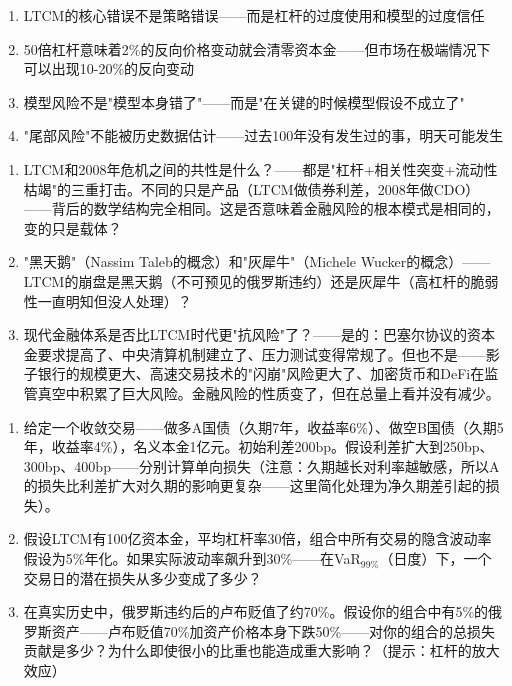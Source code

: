 \documentclass[a4paper,11pt]{ctexbook}
\begin{document}
\begin{lessonsummary}
\begin{enumerate}
  \item LTCM的核心错误不是策略错误——而是杠杆的过度使用和模型的过度信任
  \item 50倍杠杆意味着2\%的反向价格变动就会清零资本金——但市场在极端情况下可以出现10-20\%的反向变动
  \item 模型风险不是"模型本身错了"——而是"在关键的时候模型假设不成立了"
  \item "尾部风险"不能被历史数据估计——过去100年没有发生过的事，明天可能发生
\end{enumerate}
\end{lessonsummary}

\begin{discuss}
\begin{enumerate}
  \item LTCM和2008年危机之间的共性是什么？——都是"杠杆+相关性突变+流动性枯竭"的三重打击。不同的只是产品（LTCM做债券利差，2008年做CDO）——背后的数学结构完全相同。这是否意味着金融风险的根本模式是相同的，变的只是载体？
  \item "黑天鹅"（Nassim Taleb的概念）和"灰犀牛"（Michele Wucker的概念）——LTCM的崩盘是黑天鹅（不可预见的俄罗斯违约）还是灰犀牛（高杠杆的脆弱性一直明知但没人处理）？
  \item 现代金融体系是否比LTCM时代更"抗风险"了？——是的：巴塞尔协议的资本金要求提高了、中央清算机制建立了、压力测试变得常规了。但也不是——影子银行的规模更大、高速交易技术的"闪崩"风险更大了、加密货币和DeFi在监管真空中积累了巨大风险。金融风险的性质变了，但在总量上看并没有减少。
\end{enumerate}
\end{discuss}

\begin{exercises}
\begin{enumerate}
  \item 给定一个收敛交易——做多A国债（久期7年，收益率6\%）、做空B国债（久期5年，收益率4\%），名义本金1亿元。初始利差200bp。假设利差扩大到250bp、300bp、400bp——分别计算单向损失（注意：久期越长对利率越敏感，所以A的损失比利差扩大对久期的影响更复杂——这里简化处理为净久期差引起的损失）。
  \item 假设LTCM有100亿资本金，平均杠杆率30倍，组合中所有交易的隐含波动率假设为5\%年化。如果实际波动率飙升到30\%——在VaR$_{99\%}$（日度）下，一个交易日的潜在损失从多少变成了多少？
  \item 在真实历史中，俄罗斯违约后的卢布贬值了约70\%。假设你的组合中有5\%的俄罗斯资产——卢布贬值70\%加资产价格本身下跌50\%——对你的组合的总损失贡献是多少？为什么即使很小的比重也能造成重大影响？（提示：杠杆的放大效应）
\end{enumerate}
\end{exercises}
\end{document}
